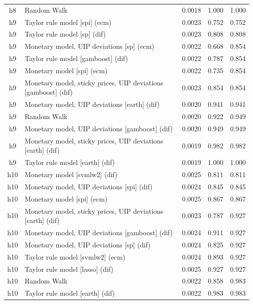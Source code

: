 \begin{ThreePartTable}
\begin{longtable}[t]{cp{5.5cm}ccc}
h8 & \raggedright Random Walk & 0.0018 & 1.000 & 1.000\\
\addlinespace
h9 & \raggedright Taylor rule model [spi] (ecm) & 0.0023 & 0.752 & 0.752\\
h9 & \raggedright Taylor rule model [sp] (dif) & 0.0023 & 0.808 & 0.808\\
h9 & \raggedright Monetary model, UIP deviations [sp] (ecm) & 0.0022 & 0.668 & 0.854\\
h9 & \raggedright Taylor rule model [gamboost] (dif) & 0.0022 & 0.787 & 0.854\\
h9 & \raggedright Monetary model [spi] (ecm) & 0.0022 & 0.735 & 0.854\\
h9 & \raggedright Monetary model, sticky prices, UIP deviations [gamboost] (dif) & 0.0023 & 0.854 & 0.854\\
h9 & \raggedright Monetary model, UIP deviations [earth] (dif) & 0.0020 & 0.941 & 0.941\\
h9 & \raggedright Random Walk & 0.0020 & 0.922 & 0.949\\
h9 & \raggedright Monetary model, UIP deviations [gamboost] (dif) & 0.0020 & 0.949 & 0.949\\
h9 & \raggedright Monetary model, sticky prices, UIP deviations [earth] (dif) & 0.0019 & 0.982 & 0.982\\
h9 & \raggedright Taylor rule model [earth] (dif) & 0.0019 & 1.000 & 1.000\\
\addlinespace
h10 & \raggedright Monetary model [svmlw2] (dif) & 0.0025 & 0.811 & 0.811\\
h10 & \raggedright Monetary model, UIP deviations [spi] (dif) & 0.0024 & 0.845 & 0.845\\
h10 & \raggedright Monetary model [spi] (ecm) & 0.0025 & 0.867 & 0.867\\
h10 & \raggedright Monetary model, sticky prices, UIP deviations [earth] (dif) & 0.0023 & 0.787 & 0.927\\
h10 & \raggedright Monetary model, UIP deviations [gamboost] (dif) & 0.0024 & 0.911 & 0.927\\
h10 & \raggedright Monetary model, UIP deviations [sp] (dif) & 0.0024 & 0.825 & 0.927\\
h10 & \raggedright Taylor rule model [svmlw2] (ecm) & 0.0024 & 0.893 & 0.927\\
h10 & \raggedright Taylor rule model [lasso] (dif) & 0.0025 & 0.927 & 0.927\\
h10 & \raggedright Random Walk & 0.0022 & 0.858 & 0.983\\
h10 & \raggedright Taylor rule model [earth] (dif) & 0.0022 & 0.983 & 0.983\\

\end{longtable}
\end{ThreePartTable}
